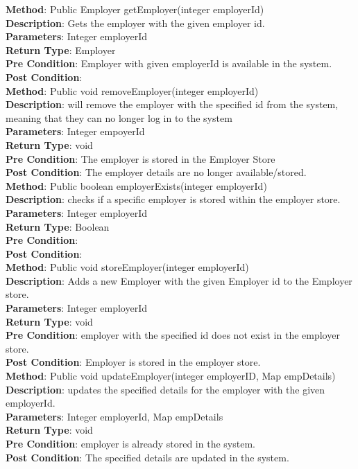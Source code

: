 \documentclass{l3deliverable}
\begin{document}
\textbf{Method}: Public Employer getEmployer(integer employerId)\\
\textbf{Description}: Gets the employer with the given employer id.\\
\textbf{Parameters}:  Integer employerId\\
\textbf{Return Type}: Employer\\
\textbf{Pre Condition}: Employer with given employerId is available in the system.\\
\textbf{Post Condition}:\\

\textbf{Method}: Public void removeEmployer(integer employerId) \\
\textbf{Description}: will remove the employer with the specified id from the system, meaning that they can no longer log in to the system\\
\textbf{Parameters}: Integer empoyerId\\
\textbf{Return Type}: void\\
\textbf{Pre Condition}: The employer is stored in the Employer Store\\
\textbf{Post Condition}: The employer details are no longer available/stored.\\

\textbf{Method}: Public boolean employerExists(integer employerId) \\
\textbf{Description}: checks if a specific employer is stored within the employer store.\\
\textbf{Parameters}: Integer employerId\\
\textbf{Return Type}: Boolean\\
\textbf{Pre Condition}:\\
\textbf{Post Condition}:\\

\textbf{Method}: Public void storeEmployer(integer employerId) \\
\textbf{Description}:  Adds a new Employer with the given Employer id to the Employer store.\\
\textbf{Parameters}: Integer employerId\\
\textbf{Return Type}: void\\
\textbf{Pre Condition}: employer with the specified id does not exist in the employer store.\\
\textbf{Post Condition}: Employer is stored in the employer store.\\

\textbf{Method}: Public void updateEmployer(integer employerID, Map empDetails)\\
\textbf{Description}: updates the specified details for the employer with the given employerId.\\
\textbf{Parameters}: Integer employerId, Map empDetails\\
\textbf{Return Type}: void\\
\textbf{Pre Condition}: employer is already stored in the system.\\
\textbf{Post Condition}: The specified details are updated in the system.\\
\end{document}
